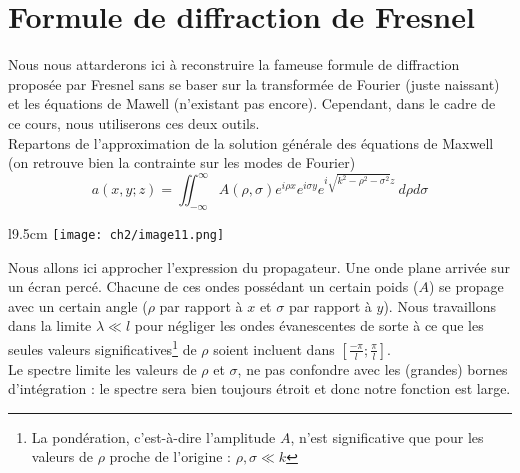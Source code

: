 \newpage
\section{Formule de diffraction de Fresnel}
Nous nous attarderons ici à reconstruire la fameuse formule de diffraction proposée par 
Fresnel sans se baser sur la transformée de Fourier (juste naissant) et les équations 
de Mawell (n'existant pas encore). Cependant, dans le cadre de ce cours, nous utiliserons 
ces deux outils.\\

Repartons de l'approximation de la solution générale des équations de Maxwell (on retrouve 
bien la contrainte sur les modes de Fourier)
\begin{equation}
a(x,y;z) = \iint_{-\infty}^\infty A(\rho,\sigma)e^{i\rho x}e^{i\sigma y} e^{i\sqrt{k^2-\rho^2-
\sigma^2}z}\ d\rho d\sigma
\end{equation}

\begin{wrapfigure}[8]{l}{9.5cm}
\vspace{-4mm}
\texttt{[image: ch2/image11.png]}
\end{wrapfigure}
Nous allons ici approcher l'expression du propagateur. Une onde plane arrivée sur un écran 
percé. Chacune de ces ondes possédant un certain poids ($A$) se propage avec un certain 
angle ($\rho$ par rapport à $x$ et $\sigma$ par rapport à $y$). Nous travaillons dans la 
limite $\lambda \ll l$ pour négliger les ondes évanescentes de sorte à ce que les seules 
valeurs significatives\footnote{La pondération, c'est-à-dire l'amplitude $A$, n'est 
significative que pour les valeurs de $\rho$ proche de l'origine : $\rho,\sigma \ll k$} de 
$\rho$ soient incluent dans $\left[\frac{-\pi}{l};\frac{\pi}{l}\right]$.\\

\danger Le spectre limite les valeurs de $\rho$ et $\sigma$, ne pas confondre avec les 
(grandes) bornes d'intégration : le spectre sera bien toujours étroit et donc notre 
fonction est large.\\

